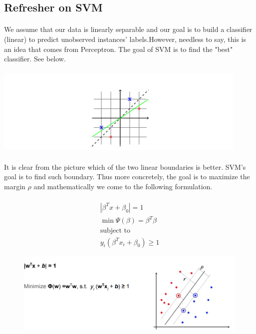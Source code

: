 \documentclass[twoside]{article}
\begin{document}
\subsection{Refresher on SVM}
\paragraph{}
We assume that our data is linearly separable and our goal is to build a classifier (linear) to predict unobserved instances' labels.However, needless to say, this is an idea that comes from Perceptron. The goal of SVM is to find the "best" classifier. See below.
\paragraph{}
\includegraphics[scale=1.3]{bestseparation.PNG}\\
\\
It is clear from the picture which of the two linear boundaries is better. SVM's goal is to find such boundary. Thus more concretely, the goal is to maximize the margin $\rho$ and mathematically we come to the following formulation.
\paragraph{}
\begin{align}
    |\beta^{T}x + \beta_{0}| = 1\\
    \min\Psi(\beta) = \beta^{T}\beta\\
    \text{subject to}\\ y_{i}(\beta^{T}x_{i} + \beta_{0}) \geq 1
\end{align}
\begin{figure}[h]
\includegraphics[scale = 0.6, inner]{bestmarginpic.PNG}
\end{figure}
\\
\end{document}
